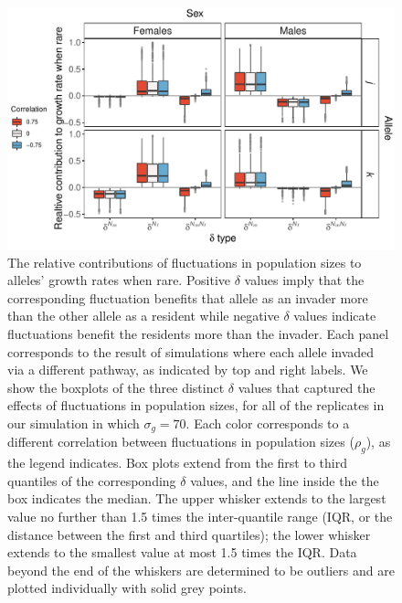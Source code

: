 \begin{refsection}
\begin{figure}[H]
  \centerline{\includegraphics[width=1\textwidth]{figures/chapter4_fig4}}
  \caption[The relative contributions of fluctuations in population sizes to alleles' growth rates when rare]{The relative contributions of fluctuations in population sizes to alleles' growth rates when rare. Positive $\delta$ values imply that the corresponding fluctuation benefits that allele as an invader more than the other allele as a resident while negative $\delta$ values indicate fluctuations benefit the residents more than the invader. Each panel corresponds to the result of simulations where each allele invaded via a different pathway, as indicated by top and right labels. We show the boxplots of the three distinct $\delta$ values that captured the effects of fluctuations in population sizes, for all of the replicates in our simulation in which $\sigma_{g}=70$. Each color corresponds to a different correlation between fluctuations in population sizes ($\rho_{g}$), as the legend indicates. Box plots extend from the first to third quantiles of the corresponding $\delta$ values, and the line inside the the box indicates the median. The upper whisker extends to the largest value no further than 1.5 times the inter-quantile range (IQR, or the distance between the first and third quartiles); the lower whisker extends to the smallest value at most 1.5 times the IQR. Data beyond the end of the whiskers are determined to be outliers and are plotted individually with solid grey points. }
    \label{fig:boxes}
\end{figure}




\end{refsection}
